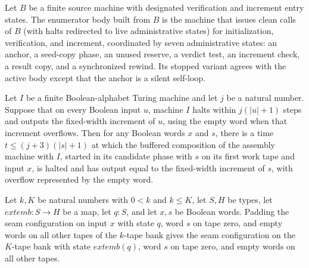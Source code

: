 \begin{definition}
\label{Complexity.enumCont_bodyTM}
\leanok
{}
Let $B$ be a finite source machine with designated verification and increment
entry states. The enumerator body built from $B$ is the machine that issues clean
calls of $B$ (with halts redirected to live administrative states) for
initialization, verification, and increment, coordinated by seven administrative
states: an anchor, a seed-copy phase, an unused reserve, a verdict test, an
increment check, a result copy, and a synchronized rewind. Its stopped variant
agrees with the active body except that the anchor is a silent self-loop.
\end{definition}

\begin{lemma}
\label{Complexity.enumCont_increment_call}
\leanok
{}
Let $I$ be a finite Boolean-alphabet Turing machine and let $j$ be a natural number.
Suppose that on every Boolean input $u$, machine $I$ halts within $j(|u|+1)$ steps and
outputs the fixed-width increment of $u$, using the empty word when that increment
overflows. Then for any Boolean words $x$ and $s$, there is a time $t\le (j+3)(|s|+1)$
at which the buffered composition of the assembly machine with $I$, started in its
candidate phase with $s$ on its first work tape and input $x$, is halted and has output
equal to the fixed-width increment of $s$, with overflow represented by the empty word.
\end{lemma}

\begin{lemma}
\label{Complexity.enumCont_pad_words}
\leanok
{}
Let $k,K$ be natural numbers with $0<k$ and $k\le K$, let $S,H$ be types, let
$	ext{emb}:S\to H$ be a map, let $q:S$, and let $x,s$ be Boolean words. Padding the seam
configuration on input $x$ with state $q$, word $s$ on tape zero, and empty words on all
other tapes of the $k$-tape bank gives the seam configuration on the $K$-tape bank with
state $	ext{emb}(q)$, word $s$ on tape zero, and empty words on all other tapes.
\end{lemma}

